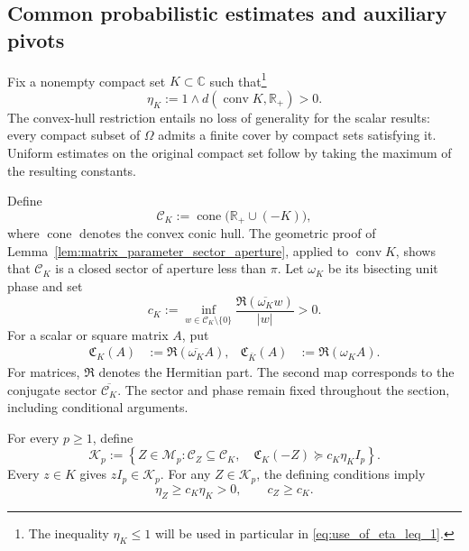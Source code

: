 \documentclass[EJP, preprint, NODS, nobera, nofontexpansion]{ejpecp}
\begin{document}
\subsection{Common probabilistic estimates and auxiliary pivots}

Fix a nonempty compact set $K\subset\mathbb C$ such that\footnote{The inequality $\eta_K\leq 1$ will be used in particular in \eqref{eq:use_of_eta_leq_1}.}
\begin{equation}\label{eq:def_family_parameter_bounds}
    \eta_K
    :=1\wedge d(\operatorname{conv}K,\mathbb R_+)>0.
\end{equation}
The convex-hull restriction entails no loss of generality for the
scalar results: every compact subset of $\Omega$ admits a finite cover
by compact sets satisfying it. Uniform estimates on the original
compact set follow by taking the maximum of the resulting constants.

Define
\begin{equation}\label{eq:def_common_probabilistic_sector}
    \mathcal C_K
    :=\operatorname{cone}\bigl(\mathbb R_+\cup(-K)\bigr),
\end{equation}
where $\operatorname{cone}$ denotes the convex conic hull.
The geometric proof of
Lemma~\ref{lem:matrix_parameter_sector_aperture}, applied to
$\operatorname{conv}K$, shows that $\mathcal C_K$ is a closed sector
of aperture less than $\pi$.
Let $\omega_K$ be its bisecting unit phase and set
\begin{equation}\label{eq:def_uniform_sector_constant}
    c_K
    :=\inf_{w\in\mathcal C_K\setminus\{0\}}
       \frac{\Re(\overline{\omega_K}w)}{|w|}>0.
\end{equation}
For a scalar or square matrix $A$, put
\begin{align}\label{eq:def_common_probabilistic_real_parts}
    \mathfrak C_K(A)&:=\Re(\overline{\omega_K}A),
    &
    \mathfrak C_{\bar K}(A)&:=\Re(\omega_KA).
\end{align}
For matrices, $\Re$ denotes the Hermitian part. The second map
corresponds to the conjugate sector $\overline{\mathcal C_K}$.
The sector and phase remain fixed throughout the section, including
conditional arguments.

For every $p\geq1$, define
\begin{equation}\label{eq:universal_sectorial_base_class}
    \mathcal K_p
    :=\left\{
        Z\in\mathcal M_p:
        \mathcal C_Z\subseteq\mathcal C_K,
        \quad
        \mathfrak C_K(-Z)\succeq c_K\eta_K I_p
    \right\}.
\end{equation}
Every $z\in K$ gives $zI_p\in\mathcal K_p$.
For any $Z\in\mathcal K_p$, the defining conditions imply
\begin{equation}\label{eq:common_probabilistic_sector_bounds}
    \eta_Z\geq c_K\eta_K>0,
    \qquad c_Z\geq c_K.
\end{equation}
\end{document}
